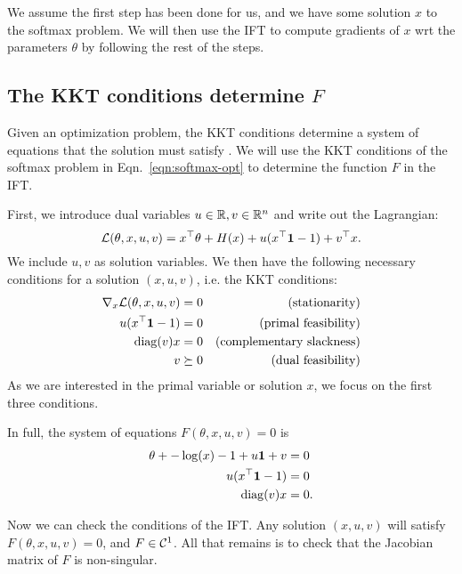 \documentclass[11pt]{article}
\begin{document}
We assume the first step has been done for us,
and we have some solution $x$ to the softmax problem.
We will then use the IFT to compute gradients of $x$ wrt the parameters $\theta$
by following the rest of the steps.

\subsection{The KKT conditions determine $F$}
Given an optimization problem, the KKT conditions determine a system of equations
that the solution must satisfy \citep{kkt-thesis,kkt}.
We will use the KKT conditions of the softmax problem in
Eqn.~\ref{eqn:softmax-opt} to determine the function $F$ in the IFT.

First, we introduce dual variables $u\in\mathbb{R},v\in\mathbb{R}^n$ and write out the Lagrangian:
$$\mathcal{L}(\theta, x, u, v) = x^\top\theta + H(x) + u(x^\top \mathbf{1} - 1) + v^\top x.$$
We include $u,v$ as solution variables.
We then have the following necessary conditions for a solution $(x,u,v)$,
i.e. the KKT conditions:
\begin{equation}
\begin{aligned}
\nabla_x \mathcal{L}(\theta, x,u,v) = 0 && \textrm{(stationarity)}\\
u(x^{\top} \mathbf{1} - 1) = 0 && \textrm{(primal feasibility)}\\
\mathrm{diag}(v)x = 0 && \textrm{(complementary slackness)}\\
v \succeq 0 && \textrm{(dual feasibility)}
\end{aligned}
\end{equation}
As we are interested in the primal variable or solution $x$,
we focus on the first three conditions.

In full, the system of equations $F(\theta, x,u,v) = 0$ is
\begin{equation}
\label{eqn:system}
\begin{aligned}
\theta + -\log(x) - 1 + u\mathbf{1} + v &= 0\\
u(x^{\top} \mathbf{1} - 1) &= 0\\
\mathrm{diag}(v)x &= 0.
\end{aligned}
\end{equation}

Now we can check the conditions of the IFT.
Any solution $(x,u,v)$ will satisfy $F(\theta, x,u,v) = 0$,
and $F \in \mathcal{C}^1$.
All that remains is to check that the Jacobian matrix of $F$ is non-singular.
\end{document}
